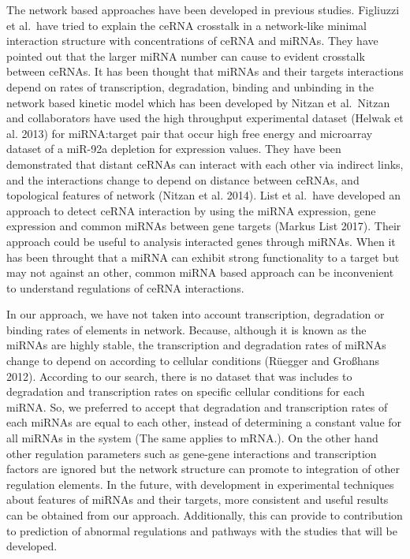 \documentclass[]{article}
\begin{document}
The network based approaches have been developed in previous studies.
Figliuzzi et al.~have tried to explain the ceRNA crosstalk in a
network-like minimal interaction structure with concentrations of ceRNA
and miRNAs. They have pointed out that the larger miRNA number can cause
to evident crosstalk between ceRNAs. It has been thought that miRNAs and
their targets interactions depend on rates of transcription,
degradation, binding and unbinding in the network based kinetic model
which has been developed by Nitzan et al.~Nitzan and collaborators have
used the high throughput experimental dataset (Helwak et al. 2013) for
miRNA:target pair that occur high free energy and microarray dataset of
a miR-92a depletion for expression values. They have been demonstrated
that distant ceRNAs can interact with each other via indirect links, and
the interactions change to depend on distance between ceRNAs, and
topological features of network (Nitzan et al. 2014). List et al.~have
developed an approach to detect ceRNA interaction by using the miRNA
expression, gene expression and common miRNAs between gene targets
(Markus List 2017). Their approach could be useful to analysis
interacted genes through miRNAs. When it has been throught that a miRNA
can exhibit strong functionality to a target but may not against an
other, common miRNA based approach can be inconvenient to understand
regulations of ceRNA interactions.

In our approach, we have not taken into account transcription,
degradation or binding rates of elements in network. Because, although
it is known as the miRNAs are highly stable, the transcription and
degradation rates of miRNAs change to depend on according to cellular
conditions (Rüegger and Großhans 2012). According to our search, there
is no dataset that was includes to degradation and transcription rates
on specific cellular conditions for each miRNA. So, we preferred to
accept that degradation and transcription rates of each miRNAs are equal
to each other, instead of determining a constant value for all miRNAs in
the system (The same applies to mRNA.). On the other hand other
regulation parameters such as gene-gene interactions and transcription
factors are ignored but the network structure can promote to integration
of other regulation elements. In the future, with development in
experimental techniques about features of miRNAs and their targets, more
consistent and useful results can be obtained from our approach.
Additionally, this can provide to contribution to prediction of abnormal
regulations and pathways with the studies that will be developed.
\end{document}
